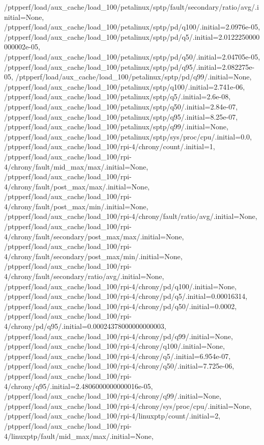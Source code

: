 {    /ptpperf/load/aux_cache/load_100/petalinux/sptp/fault/secondary/ratio/avg/.initial=None,
    /ptpperf/load/aux_cache/load_100/petalinux/sptp/pd/q100/.initial=2.0976e-05,
    /ptpperf/load/aux_cache/load_100/petalinux/sptp/pd/q5/.initial=2.0122250000000002e-05,
    /ptpperf/load/aux_cache/load_100/petalinux/sptp/pd/q50/.initial=2.04705e-05,
    /ptpperf/load/aux_cache/load_100/petalinux/sptp/pd/q95/.initial=2.082275e-05,
    /ptpperf/load/aux_cache/load_100/petalinux/sptp/pd/q99/.initial=None,
    /ptpperf/load/aux_cache/load_100/petalinux/sptp/q100/.initial=2.741e-06,
    /ptpperf/load/aux_cache/load_100/petalinux/sptp/q5/.initial=2.6e-08,
    /ptpperf/load/aux_cache/load_100/petalinux/sptp/q50/.initial=2.84e-07,
    /ptpperf/load/aux_cache/load_100/petalinux/sptp/q95/.initial=8.25e-07,
    /ptpperf/load/aux_cache/load_100/petalinux/sptp/q99/.initial=None,
    /ptpperf/load/aux_cache/load_100/petalinux/sptp/sys/proc/cpu/.initial=0.0,
    /ptpperf/load/aux_cache/load_100/rpi-4/chrony/count/.initial=1,
    /ptpperf/load/aux_cache/load_100/rpi-4/chrony/fault/mid_max/max/.initial=None,
    /ptpperf/load/aux_cache/load_100/rpi-4/chrony/fault/post_max/max/.initial=None,
    /ptpperf/load/aux_cache/load_100/rpi-4/chrony/fault/post_max/min/.initial=None,
    /ptpperf/load/aux_cache/load_100/rpi-4/chrony/fault/ratio/avg/.initial=None,
    /ptpperf/load/aux_cache/load_100/rpi-4/chrony/fault/secondary/post_max/max/.initial=None,
    /ptpperf/load/aux_cache/load_100/rpi-4/chrony/fault/secondary/post_max/min/.initial=None,
    /ptpperf/load/aux_cache/load_100/rpi-4/chrony/fault/secondary/ratio/avg/.initial=None,
    /ptpperf/load/aux_cache/load_100/rpi-4/chrony/pd/q100/.initial=None,
    /ptpperf/load/aux_cache/load_100/rpi-4/chrony/pd/q5/.initial=0.00016314,
    /ptpperf/load/aux_cache/load_100/rpi-4/chrony/pd/q50/.initial=0.0002,
    /ptpperf/load/aux_cache/load_100/rpi-4/chrony/pd/q95/.initial=0.00024378000000000003,
    /ptpperf/load/aux_cache/load_100/rpi-4/chrony/pd/q99/.initial=None,
    /ptpperf/load/aux_cache/load_100/rpi-4/chrony/q100/.initial=None,
    /ptpperf/load/aux_cache/load_100/rpi-4/chrony/q5/.initial=6.954e-07,
    /ptpperf/load/aux_cache/load_100/rpi-4/chrony/q50/.initial=7.725e-06,
    /ptpperf/load/aux_cache/load_100/rpi-4/chrony/q95/.initial=2.4806000000000016e-05,
    /ptpperf/load/aux_cache/load_100/rpi-4/chrony/q99/.initial=None,
    /ptpperf/load/aux_cache/load_100/rpi-4/chrony/sys/proc/cpu/.initial=None,
    /ptpperf/load/aux_cache/load_100/rpi-4/linuxptp/count/.initial=2,
    /ptpperf/load/aux_cache/load_100/rpi-4/linuxptp/fault/mid_max/max/.initial=None,
}
